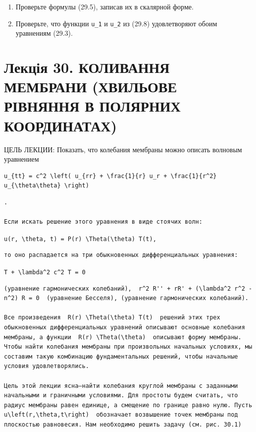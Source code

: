 \documentclass[
  ukrainian,
]{article}
\begin{document}
\begin{enumerate}
\def\labelenumi{\arabic{enumi}.}
\setcounter{enumi}{3}
\item
  Проверьте формулы (29.5), записав их в скалярной форме.
\item
  Проверьте, что функции \texttt{u\_1} и \texttt{u\_2} из (29.8)
  удовлетворяют обоим уравнениям (29.3).
\end{enumerate}

\section{Лекція 30. КОЛИВАННЯ МЕМБРАНИ (ХВИЛЬОВЕ РІВНЯННЯ В ПОЛЯРНИХ
КООРДИНАТАХ)}\label{ux43bux435ux43aux446ux456ux44f-30.-ux43aux43eux43bux438ux432ux430ux43dux43dux44f-ux43cux435ux43cux431ux440ux430ux43dux438-ux445ux432ux438ux43bux44cux43eux432ux435-ux440ux456ux432ux43dux44fux43dux43dux44f-ux432-ux43fux43eux43bux44fux440ux43dux438ux445-ux43aux43eux43eux440ux434ux438ux43dux430ux442ux430ux445}

ЦЕЛЬ ЛЕКЦИИ: Показать, что колебания мембраны можно описать волновым
уравнением

\begin{verbatim}
u_{tt} = c^2 \left( u_{rr} + \frac{1}{r} u_r + \frac{1}{r^2} u_{\theta\theta} \right)
\end{verbatim}

\begin{verbatim}
.

Если искать решение этого уравнения в виде стоячих волн:
\end{verbatim}

\texttt{u(r,\ \textbackslash{}theta,\ t)\ =\ P(r)\ \textbackslash{}Theta(\textbackslash{}theta)\ T(t),}

\begin{verbatim}
то оно распадается на три обыкновенных дифференциальных уравнения:
\end{verbatim}

\texttt{T\textquotesingle{}\textquotesingle{}\ +\ \textbackslash{}lambda\^{}2\ c\^{}2\ T\ =\ 0}

\begin{verbatim}
(уравнение гармонических колебаний),  r^2 R'' + rR' + (\lambda^2 r^2 - n^2) R = 0  (уравнение Бесселя), (уравнение гармонических колебаний).

Все произведения  R(r) \Theta(\theta) T(t)  решений этих трех обыкновенных дифференциальных уравнений описывают основные колебания мембраны, а функции  R(r) \Theta(\theta)  описывают форму мембраны. Чтобы найти колебания мембраны при произвольных начальных условиях, мы составим такую комбинацию фундаментальных решений, чтобы начальные условия удовлетворялись.

Цель этой лекции ясна—найти колебания круглой мембраны с заданными начальными и граничными условиями. Для простоты будем считать, что радиус мембраны равен единице, а смещение по границе равно нулю. Пусть  u\left(r,\theta,t\right)  обозначает возвышение точек мембраны под плоскостью равновесия. Нам необходимо решить задачу (см. рис. 30.1)
\end{verbatim}
\end{document}
